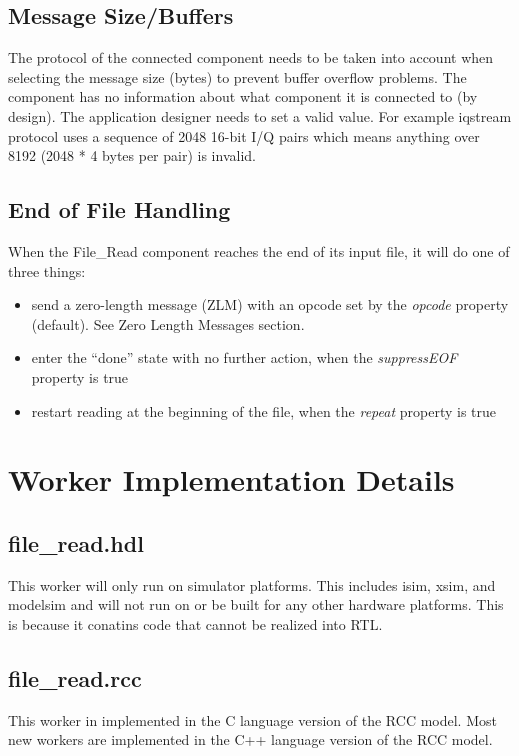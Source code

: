 \documentclass{article}
\def\comp{file\_read}
\begin{document}
\begin{flushleft}
\subsection*{Message Size/Buffers}
The protocol of the connected component needs to be taken into account when selecting the message size (bytes) to prevent buffer overflow problems.  The component has no information about what component it is connected to (by design). The application designer needs to set a valid value.  For example iqstream protocol uses a sequence of 2048 16-bit I/Q pairs which means anything over 8192 (2048 * 4 bytes per pair) is invalid.
\subsection*{End of File Handling}
When the File\_Read component reaches the end of its input file, it will do one of three
things:
\begin{itemize}
  \item send a zero-length message (ZLM) with an opcode set by the \textit{opcode} property (default).  See Zero Length Messages section.
  \item enter the ``done'' state with no further action, when the \textit{suppressEOF} property
is true
  \item restart reading at the beginning of the file, when the \textit{repeat} property is true
\end{itemize}

\end{flushleft}

\section*{Worker Implementation Details}
\subsection*{\comp.hdl}
\begin{flushleft}
This worker will only run on simulator platforms.  This includes isim, xsim, and modelsim and will not run on or be built for any other hardware platforms.  This is because it conatins code that cannot be realized into RTL.
\end{flushleft}
\subsection*{\comp.rcc}
\begin{flushleft}
This worker in implemented in the C language version of the RCC model.  Most new workers are implemented in the C++ language version of the RCC model.
\end{flushleft}
\end{document}

